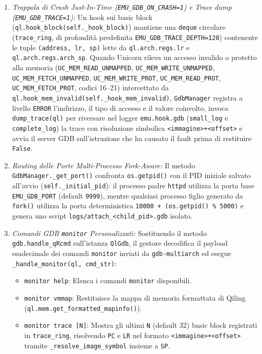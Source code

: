 \documentclass[11pt,a4paper]{article}
\begin{document}
\begin{itemize}
\begin{enumerate}
        \item \textit{Trappola di Crash Just-In-Time (\texttt{EMU\_GDB\_ON\_CRASH=1}) e Trace dump (\texttt{EMU\_GDB\_TRACE=1}):} Un hook sui basic block (\texttt{ql.hook\_block(self.\_hook\_block)}) mantiene una \texttt{deque} circolare (\texttt{trace\_ring}, di profondità predefinita \texttt{EMU\_GDB\_TRACE\_DEPTH=128}) contenente le tuple \texttt{(address, lr, sp)} lette da \texttt{ql.arch.regs.lr} e \texttt{ql.arch.regs.arch\_sp}. Quando Unicorn rileva un accesso invalido o protetto alla memoria (\texttt{UC\_MEM\_READ\_UNMAPPED}, \texttt{UC\_MEM\_WRITE\_UNMAPPED}, \texttt{UC\_MEM\_FETCH\_UNMAPPED}, \texttt{UC\_MEM\_WRITE\_PROT}, \texttt{UC\_MEM\_READ\_PROT}, \texttt{UC\_MEM\_FETCH\_PROT}, codici 16--21) intercettato da \texttt{ql.hook\_mem\_invalid(self.\_hook\_mem\_invalid)}, \texttt{GdbManager} registra a livello \texttt{ERROR} l'indirizzo, il tipo di accesso e il valore coinvolto, invoca \texttt{dump\_trace(ql)} per riversare nel logger \texttt{emu.hook.gdb} (\texttt{small\_log} e \texttt{complete\_log}) la trace con risoluzione simbolica \texttt{<immagine>+<offset>} e avvia il server GDB sull'istruzione che ha causato il fault prima di restituire \texttt{False}.
        \item \textit{Routing delle Porte Multi-Processo Fork-Aware:} Il metodo \texttt{GdbManager.\_get\_port()} confronta \texttt{os.getpid()} con il PID iniziale salvato all'avvio (\texttt{self.\_initial\_pid}): il processo padre \texttt{httpd} utilizza la porta base \texttt{EMU\_GDB\_PORT} (default \texttt{9999}), mentre qualsiasi processo figlio generato da \texttt{fork()} utilizza la porta deterministica \texttt{10000 + (os.getpid() \% 5000)} e genera uno script \texttt{logs/attach\_<child\_pid>.gdb} isolato.
        \item \textit{Comandi GDB \texttt{monitor} Personalizzati:} Sostituendo il metodo \texttt{gdb.handle\_qRcmd} sull'istanza \texttt{QlGdb}, il gestore decodifica il payload esadecimale dei comandi \texttt{monitor} inviati da \texttt{gdb-multiarch} ed esegue \texttt{\_handle\_monitor(ql, cmd\_str)}:
        \begin{itemize}
            \item \texttt{monitor help}: Elenca i comandi \texttt{monitor} disponibili.
            \item \texttt{monitor vmmap}: Restituisce la mappa di memoria formattata di Qiling (\texttt{ql.mem.get\_formatted\_mapinfo()}).
            \item \texttt{monitor trace [N]}: Mostra gli ultimi \texttt{N} (default 32) basic block registrati in \texttt{trace\_ring}, risolvendo \texttt{PC} e \texttt{LR} nel formato \texttt{<immagine>+<offset>} tramite \texttt{\_resolve\_image\_symbol} insieme a \texttt{SP}.

\end{itemize}
\end{enumerate}
\end{itemize}
\end{document}
